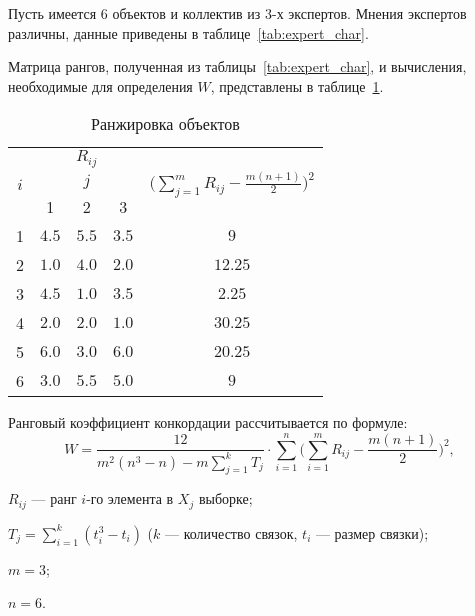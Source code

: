 Пусть имеется 6 объектов и коллектив из 3-х экспертов.
Мнения экспертов различны, данные приведены в таблице~\ref{tab:expert_char}.

Матрица рангов, полученная из таблицы~\ref{tab:expert_char}, и вычисления, необходимые для определения $W$, представлены в таблице~\ref{tab:expert_ran}.

\begin{table}[H]
	\caption{Ранжировка объектов}
	\label{tab:expert_ran}
	\begin{tabular}{|c|c|c|c|c|}
		\hline
		\multirow{3}{*}{$i$} & \multicolumn{3}{c|}{$R_{ij}$} & \multirow{3}{*}{$\bigg(\sum^m_{j=1}R_{ij} - \frac{m(n+1)}{2}\bigg)^2$}                   \\ \cline{1-4}
		                     & \multicolumn{3}{c|}{$j$}      &                                                                                          \\ \cline{1-4}
		                     & 1                             & 2                                                                      & 3     &         \\ \hline
		1                    & $4.5$                         & $5.5$                                                                  & $3.5$ & $9$     \\ \hline
		2                    & $1.0$                         & $4.0$                                                                  & $2.0$ & $12.25$ \\ \hline
		3                    & $4.5$                         & $1.0$                                                                  & $3.5$ & $2.25$  \\ \hline
		4                    & $2.0$                         & $2.0$                                                                  & $1.0$ & $30.25$ \\ \hline
		5                    & $6.0$                         & $3.0$                                                                  & $6.0$ & $20.25$ \\ \hline
		6                    & $3.0$                         & $5.5$                                                                  & $5.0$ & $9$     \\ \hline
	\end{tabular}
\end{table}

Ранговый коэффициент конкордации рассчитывается по формуле:
\[
	W = \frac{12}{m^2(n^3-n) - m \sum^k_{j=1}T_j} \cdot \sum_{i=1}^n\bigg(\sum^m_{i=1}R_{ij} - \frac{m(n+1)}{2}\bigg)^2,
\]
\begin{description}
	\item[где] $R_{ij}$ --- ранг $i$-го элемента в $X_j$ выборке;
	\item $T_j = \sum^k_{i=1} (t^3_i - t_i)$ ($k$ --- количество связок, $t_i$ --- размер связки);
	\item $m=3$;
	\item $n=6$.
\end{description}

